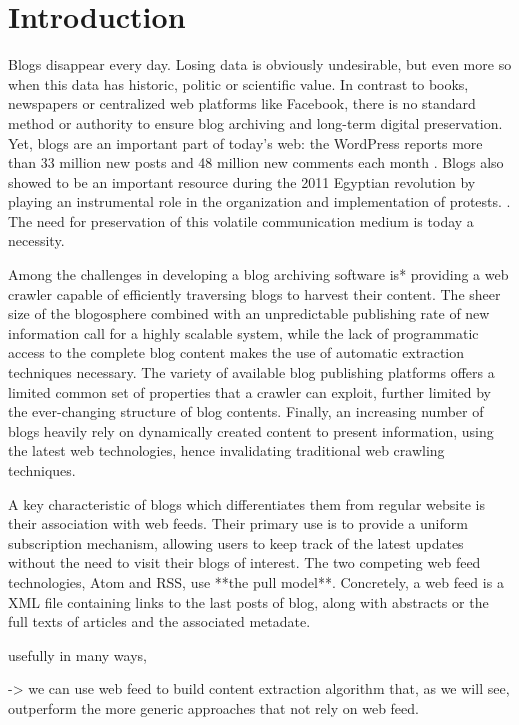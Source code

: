 \section{Introduction}

Blogs disappear every day. Losing data is obviously undesirable, but even more so when this data has historic, politic or scientific value. In contrast to books, newspapers or centralized web platforms like Facebook, there is no standard method or authority to ensure blog archiving and long-term digital preservation. Yet, blogs are an important part of today's web: the WordPress reports more than 33 million new posts and 48 million new comments each month \cite{wordpress2014}. Blogs also showed to be an important resource during the 2011 Egyptian revolution by playing an instrumental role in the organization and implementation of protests. \cite{nahedeltantawy2012}. The need for preservation of this volatile communication medium is today a necessity.

Among the challenges in developing a blog archiving software is* providing a web crawler capable of efficiently traversing blogs to harvest their content. The sheer size of the blogosphere combined with an unpredictable publishing rate of new information call for a highly scalable system, while the lack of programmatic access to the complete blog content makes the use of automatic extraction techniques necessary. The variety of available blog publishing platforms offers a limited common set of properties that a crawler can exploit, further limited by the ever-changing structure of blog contents. Finally, an increasing number of blogs heavily rely on dynamically created content to present information, using the latest web technologies, hence invalidating traditional web crawling techniques.

A key characteristic of blogs which differentiates them from regular website is their association with web feeds. Their primary use is to provide a uniform subscription mechanism, allowing users to keep track of the latest updates without the need to visit their blogs of interest. The two competing web feed technologies, Atom and RSS, use **the pull model**. Concretely, a web feed is a XML file containing links to the last posts of blog, along with abstracts or the full texts of articles and the associated metadate.


usefully in many ways, 

-> we can use web feed to build content extraction algorithm that, as we will see, outperform the more generic approaches that not rely on web feed.

